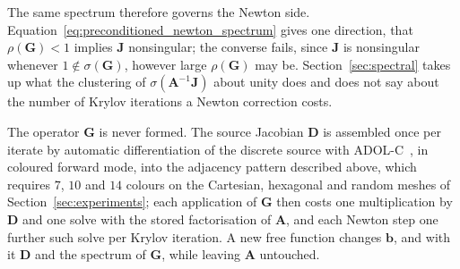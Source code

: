 The same spectrum therefore governs the Newton side. Equation~\eqref{eq:preconditioned_newton_spectrum} gives one direction, that $\rho(\mathbf{G})<1$ implies $\mathbf{J}$ nonsingular; the converse fails, since $\mathbf{J}$ is nonsingular whenever $1\notin\sigma(\mathbf{G})$, however large $\rho(\mathbf{G})$ may be. Section~\ref{sec:spectral} takes up what the clustering of $\sigma(\mathbf{A}^{-1}\mathbf{J})$ about unity does and does not say about the number of Krylov iterations a Newton correction costs.

The operator $\mathbf{G}$ is never formed. The source Jacobian $\mathbf{D}$ is assembled once per iterate by automatic differentiation of the discrete source with ADOL-C~\cite{Griewank1996AlgorithmADOL-C}, in coloured forward mode, into the adjacency pattern described above, which requires $7$, $10$ and $14$ colours on the Cartesian, hexagonal and random meshes of Section~\ref{sec:experiments}; each application of $\mathbf{G}$ then costs one multiplication by $\mathbf{D}$ and one solve with the stored factorisation of $\mathbf{A}$, and each Newton step one further such solve per Krylov iteration. A new free function changes $\mathbf{b}$, and with it $\mathbf{D}$ and the spectrum of $\mathbf{G}$, while leaving $\mathbf{A}$ untouched.